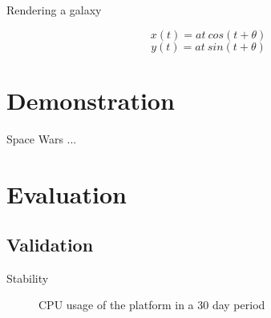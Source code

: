 \documentclass{beamer}
\begin{document}
\begin{frame}{Rendering a galaxy}
\begin{minipage}{.60\textwidth}
\noindent{}
\end{minipage}
\begin{minipage}{.35\textwidth}
$$x(t) = at \: cos(t + \theta)$$
         $$y(t) = at \: sin(t + \theta)$$
\end{minipage}
\end{frame}
\section{Demonstration}
\begin{frame}{Space Wars}
...
\end{frame}
\section{Evaluation}
\subsection{Validation}
\begin{frame}{Stability}
\begin{figure}[H]
\noindent{}
\caption{CPU usage of the platform in a 30 day period}
\end{figure}
\end{frame}
\end{document}
